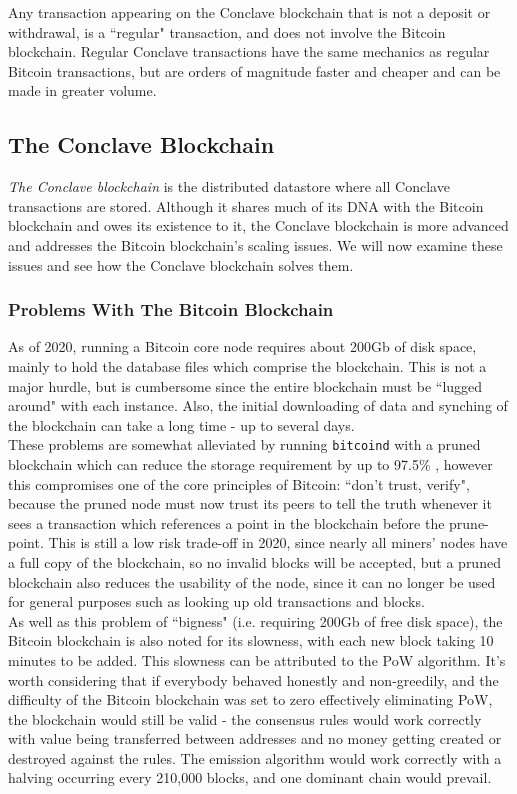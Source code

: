 \documentclass{report}
\begin{document}
			Any transaction appearing on the Conclave blockchain that is not a deposit or withdrawal, is a ``regular" transaction, and does not involve the Bitcoin blockchain. Regular Conclave transactions have the same mechanics as regular Bitcoin transactions, but are orders of magnitude faster and cheaper and can be made in greater volume.
		\subsection{The Conclave Blockchain}
			\textit{The Conclave blockchain} is the distributed datastore where all Conclave transactions are stored. Although it shares much of its DNA with the Bitcoin blockchain and owes its existence to it, the Conclave blockchain is more advanced and addresses the Bitcoin blockchain's scaling issues. We will now examine these issues and see how the Conclave blockchain solves them.
			\subsubsection{Problems With The Bitcoin Blockchain}
				As of 2020, running a Bitcoin core node requires about 200Gb of disk space, mainly to hold the database files which comprise the blockchain. This is not a major hurdle, but is cumbersome since the entire blockchain must be ``lugged around" with each instance. Also, the initial downloading of data and synching of the blockchain can take a long time - up to several days. \\

				These problems are somewhat alleviated by running \texttt{bitcoind} with a pruned blockchain  which can reduce the storage requirement by up to 97.5\% \cite{prune}, however  this compromises one of the core principles of Bitcoin: ``don't trust, verify", because the pruned node must now trust its peers to tell the truth whenever it sees a transaction which references a point in the blockchain before the prune-point. This is still a low risk trade-off in 2020, since nearly all miners' nodes have a full copy of the blockchain, so no invalid blocks will be accepted, but a pruned blockchain also reduces the usability of the node, since it can no longer be used for general purposes such as looking up old transactions and blocks. \\

				As well as this problem of ``bigness" (i.e. requiring 200Gb of free disk space), the Bitcoin blockchain is also noted for its slowness, with each new block taking 10 minutes to be added. This slowness can be attributed to the PoW algorithm. It's worth considering that if everybody behaved honestly and non-greedily, and the difficulty of the Bitcoin blockchain was set to zero effectively eliminating PoW,  the blockchain would still be valid - the consensus rules would work correctly with value being transferred between addresses and no money getting created or destroyed against the rules. The emission algorithm would work correctly with a halving occurring every 210,000 blocks, and one dominant chain would prevail. \\
\end{document}
